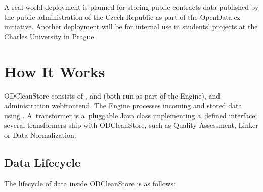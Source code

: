 A real-world deployment is planned for storing public contracts data published by the public administration of the Czech Republic as part of the OpenData.cz initiative. Another deployment will be for internal use in students' projects at the Charles University in Prague.


\chapter{How It Works}
\label{chap:howItWorks}

ODCleanStore consists of ,  and  (both run as part of the Engine), and administration webfrontend. The Engine processes incoming and stored data using . A~transformer is a~pluggable Java class implementing a~defined interface; several transformers ship with ODCleanStore, such as Quality Assessment, Linker or Data Normalization.

\section{Data Lifecycle}

The lifecycle of data inside ODCleanStore is as follows:

